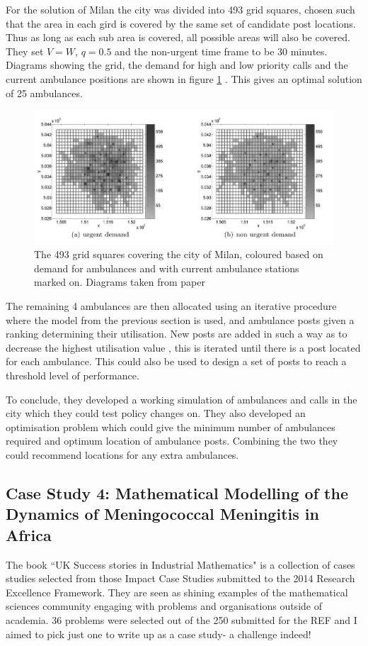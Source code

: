 \documentclass[11pt]{article} %
\begin{document}
 
For the solution of Milan the city was divided into 493 grid squares, chosen such that the area in each gird is covered by the same set of candidate post locations. Thus as long as each sub area is covered, all possible areas will also be covered. They set $ V=W $, $ q=0.5 $ and the non-urgent time frame to be 30 minutes. Diagrams showing the grid, the demand for high and low priority calls and the current ambulance positions are shown in figure \ref{fig:ems-milan} . This gives an optimal solution of 25 ambulances.

\begin{figure}
	\centering
	\includegraphics[width=0.9\linewidth]{"Report_images/ems milan"}
	\caption{The 493 grid squares covering the city of Milan, coloured based on demand for ambulances and with current ambulance stations marked on. Diagrams taken from paper \cite{Carello2013}}
	\label{fig:ems-milan}
\end{figure}

The remaining 4 ambulances are then allocated using an iterative procedure where the model from the previous section is used, and ambulance posts given  a ranking determining their utilisation. New posts are added in such a way as to decrease the highest utilisation value , this is iterated until there is a post located for each ambulance. This could also be used to design a set of posts to reach a threshold level of performance.

To conclude, they developed a working simulation of ambulances and calls in the city which they could test policy changes on. They also developed an optimisation problem which could give the minimum number of ambulances required and optimum location of ambulance posts. Combining the two they could recommend locations for any extra ambulances.



	\subsection{Case Study 4: Mathematical Modelling of the Dynamics of Meningococcal Meningitis in Africa \label{Africa }}
The book ``UK Success stories in Industrial Mathematics" \cite{Aston2016} is a collection of cases studies selected from those Impact Case Studies submitted to the 2014 Research Excellence Framework. They are seen as shining examples of the mathematical sciences community engaging with problems and organisations outside of academia. 36 problems were selected out of the 250 submitted for the REF and I aimed to pick just one to write up as a case study- a challenge indeed!
\end{document}
